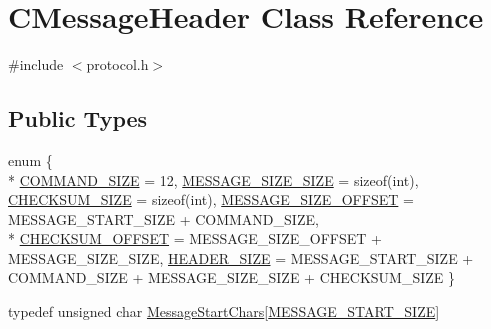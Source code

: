 \hypertarget{class_c_message_header}{}\section{C\+Message\+Header Class Reference}
\label{class_c_message_header}


{\ttfamily \#include $<$protocol.\+h$>$}

\subsection*{Public Types}
\begin{DoxyCompactItemize}
\item 
enum \{ \\*
\hyperlink{class_c_message_header_ae63fde66d9aa91c44314b11cdd0dc57aa8c1bfc0fa6a63c8b73abef30555a5e54}{C\+O\+M\+M\+A\+N\+D\+\_\+\+S\+I\+Z\+E} = 12, 
\hyperlink{class_c_message_header_ae63fde66d9aa91c44314b11cdd0dc57aa223ee9c2e0e31d0afe31c713b41400d2}{M\+E\+S\+S\+A\+G\+E\+\_\+\+S\+I\+Z\+E\+\_\+\+S\+I\+Z\+E} = sizeof(int), 
\hyperlink{class_c_message_header_ae63fde66d9aa91c44314b11cdd0dc57aac92b66287a05d5c96bf494ff5a48e726}{C\+H\+E\+C\+K\+S\+U\+M\+\_\+\+S\+I\+Z\+E} = sizeof(int), 
\hyperlink{class_c_message_header_ae63fde66d9aa91c44314b11cdd0dc57aa73cc507b1a2c32fba10305201e40f2b3}{M\+E\+S\+S\+A\+G\+E\+\_\+\+S\+I\+Z\+E\+\_\+\+O\+F\+F\+S\+E\+T} = M\+E\+S\+S\+A\+G\+E\+\_\+\+S\+T\+A\+R\+T\+\_\+\+S\+I\+Z\+E + C\+O\+M\+M\+A\+N\+D\+\_\+\+S\+I\+Z\+E, 
\\*
\hyperlink{class_c_message_header_ae63fde66d9aa91c44314b11cdd0dc57aad4e76479ab116367800a146dbb299393}{C\+H\+E\+C\+K\+S\+U\+M\+\_\+\+O\+F\+F\+S\+E\+T} = M\+E\+S\+S\+A\+G\+E\+\_\+\+S\+I\+Z\+E\+\_\+\+O\+F\+F\+S\+E\+T + M\+E\+S\+S\+A\+G\+E\+\_\+\+S\+I\+Z\+E\+\_\+\+S\+I\+Z\+E, 
\hyperlink{class_c_message_header_ae63fde66d9aa91c44314b11cdd0dc57aadd8582d526addef583c978e5261dfec1}{H\+E\+A\+D\+E\+R\+\_\+\+S\+I\+Z\+E} = M\+E\+S\+S\+A\+G\+E\+\_\+\+S\+T\+A\+R\+T\+\_\+\+S\+I\+Z\+E + C\+O\+M\+M\+A\+N\+D\+\_\+\+S\+I\+Z\+E + M\+E\+S\+S\+A\+G\+E\+\_\+\+S\+I\+Z\+E\+\_\+\+S\+I\+Z\+E + C\+H\+E\+C\+K\+S\+U\+M\+\_\+\+S\+I\+Z\+E
 \}
\item 
typedef unsigned char \hyperlink{class_c_message_header_a0d0eeb540cbf4087973f6652ad61878f}{Message\+Start\+Chars}\mbox{[}\hyperlink{protocol_8h_a6bcadada595cc3da13e6a04be1715917}{M\+E\+S\+S\+A\+G\+E\+\_\+\+S\+T\+A\+R\+T\+\_\+\+S\+I\+Z\+E}\mbox{]}
\end{DoxyCompactItemize}

